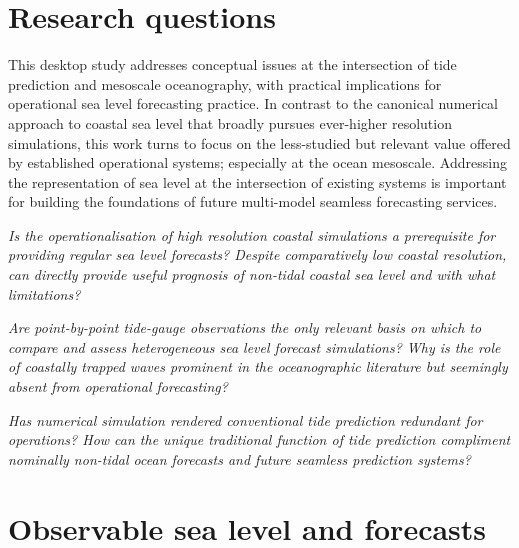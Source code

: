 \section{Research questions}
This desktop study addresses conceptual issues at the intersection of tide prediction and mesoscale oceanography, with practical implications for operational sea level forecasting practice. 
In contrast to the canonical numerical approach to coastal sea level that broadly pursues  ever-higher resolution simulations, this work turns to focus on the less-studied but relevant value offered by established operational systems; especially at the ocean mesoscale. Addressing the representation of sea level at the intersection of existing systems is important for building the foundations of future multi-model seamless forecasting services.


\emph{%
Is the operationalisation of high resolution coastal simulations a prerequisite for providing regular sea level forecasts?  Despite comparatively low coastal resolution, can \BL{} directly provide useful prognosis of non-tidal coastal sea level and with what limitations? }



\emph{Are point-by-point tide-gauge observations the only relevant basis on which to compare and assess heterogeneous sea level forecast simulations? 
Why is the role of coastally trapped waves prominent in the oceanographic literature but seemingly absent from operational forecasting?}



\emph{Has numerical simulation rendered conventional tide prediction redundant for operations?  How can the unique traditional function of tide prediction compliment nominally non-tidal ocean forecasts and future seamless prediction systems? 
}


\section{Observable sea level and forecasts}

